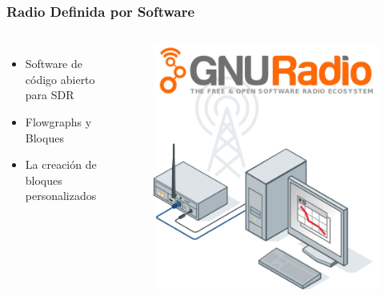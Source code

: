 \begin{frame}
\frametitle{Radio Definida por Software}
\begin{columns}
	\begin{itemize}	
		\item { Software de código abierto para SDR}
		\item {	Flowgraphs y Bloques }
		\item { La creación de bloques personalizados }
	\end{itemize}
	\begin{figure}
		\includegraphics[scale=0.25]{sdr}
	\end{figure}
\end{columns}
\end{frame}

